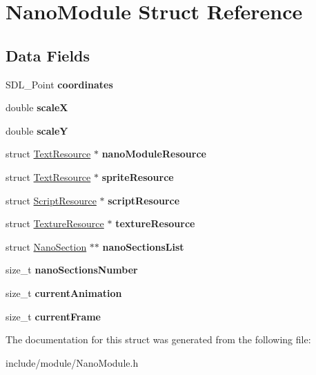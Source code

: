 \hypertarget{struct_nano_module}{}\section{Nano\+Module Struct Reference}
\label{struct_nano_module}
\subsection*{Data Fields}
\begin{DoxyCompactItemize}
\item 
\hypertarget{struct_nano_module_a667ad041f76f3b99c2ea65cd78b668ea}{}\label{struct_nano_module_a667ad041f76f3b99c2ea65cd78b668ea} 
S\+D\+L\+\_\+\+Point {\bfseries coordinates}
\item 
\hypertarget{struct_nano_module_af04d6c916584bdddd6a334359ff1059d}{}\label{struct_nano_module_af04d6c916584bdddd6a334359ff1059d} 
double {\bfseries scaleX}
\item 
\hypertarget{struct_nano_module_a936cc64e631dcd2b4ea124d5d8d4fe38}{}\label{struct_nano_module_a936cc64e631dcd2b4ea124d5d8d4fe38} 
double {\bfseries scaleY}
\item 
\hypertarget{struct_nano_module_ada202611939c35f57e7b4945b998fa83}{}\label{struct_nano_module_ada202611939c35f57e7b4945b998fa83} 
struct \hyperlink{struct_text_resource}{Text\+Resource} $\ast$ {\bfseries nano\+Module\+Resource}
\item 
\hypertarget{struct_nano_module_ac402150bd2243d7a6f04756f7b624fa1}{}\label{struct_nano_module_ac402150bd2243d7a6f04756f7b624fa1} 
struct \hyperlink{struct_text_resource}{Text\+Resource} $\ast$ {\bfseries sprite\+Resource}
\item 
\hypertarget{struct_nano_module_abc27117170d75eb9af11c98fd2d5d855}{}\label{struct_nano_module_abc27117170d75eb9af11c98fd2d5d855} 
struct \hyperlink{struct_script_resource}{Script\+Resource} $\ast$ {\bfseries script\+Resource}
\item 
\hypertarget{struct_nano_module_aedd0da0c072332f83e64105f8682bbdf}{}\label{struct_nano_module_aedd0da0c072332f83e64105f8682bbdf} 
struct \hyperlink{struct_texture_resource}{Texture\+Resource} $\ast$ {\bfseries texture\+Resource}
\item 
\hypertarget{struct_nano_module_aec63f87f8d4f3afbfdb13d8f6ad16a9b}{}\label{struct_nano_module_aec63f87f8d4f3afbfdb13d8f6ad16a9b} 
struct \hyperlink{struct_nano_section}{Nano\+Section} $\ast$$\ast$ {\bfseries nano\+Sections\+List}
\item 
\hypertarget{struct_nano_module_add9bc2388f3bad3d94c9912c38730980}{}\label{struct_nano_module_add9bc2388f3bad3d94c9912c38730980} 
size\+\_\+t {\bfseries nano\+Sections\+Number}
\item 
\hypertarget{struct_nano_module_a712df7aeb9afad06723b1d6039536010}{}\label{struct_nano_module_a712df7aeb9afad06723b1d6039536010} 
size\+\_\+t {\bfseries current\+Animation}
\item 
\hypertarget{struct_nano_module_a3ff28beecee781f499b33b0884780b85}{}\label{struct_nano_module_a3ff28beecee781f499b33b0884780b85} 
size\+\_\+t {\bfseries current\+Frame}
\end{DoxyCompactItemize}


The documentation for this struct was generated from the following file\+:\begin{DoxyCompactItemize}
\item 
include/module/Nano\+Module.\+h\end{DoxyCompactItemize}

